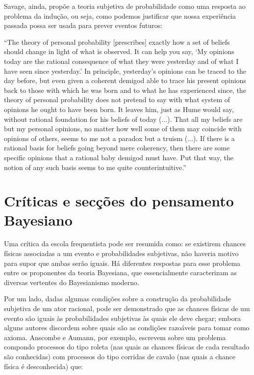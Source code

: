 Savage, ainda, propõe a teoria subjetiva de probabilidade como uma resposta ao problema da indução, ou seja,
como podemos justificar que nossa experiência passada possa ser usada para prever eventos futuros:

``The theory of personal probability [prescribes] exactly how a set of beliefs should change in light of what is observed.
It can help you say, `My opinions today are the rational consequence of what they were yesterday and of what I have seen
since yesterday.' In principle, yesterday's opinions can be traced to the day before, but even given a coherent demigod
able to trace his present opinions back to those with which he was born and to what he has experienced since, the theory
of personal probability does not pretend to say with what system of opinions he ought to have been born. It leaves him, just
as Hume would say, without rational foundation for his beliefs of today (...). That all my beliefs are but my personal
opinions, no matter how well some of them may coincide with opinions of others, seems to me not a paradox but a truism (...).
If there is a rational basis for beliefs going beyond mere coherency, then there are some specific opinions that a rational
baby demigod must have. Put that way, the notion of any such basis seems to me quite counterintuitive.'' \citep{Savage67}

\section{Críticas e secções do pensamento Bayesiano}

Uma crítica da escola frequentista pode ser resumida como: se existirem chances físicas associadas a um evento
e probabilidades subjetivas, não haveria motivo para supor que ambas serão iguais. Há diferentes respostas para esse problema 
entre os proponentes da teoria Bayesiana, que essencialmente caracterizam as diversas vertentes do Bayesianismo
moderno.

Por um lado, dadas algumas condições sobre a construção da
probabilidade subjetiva de um ator racional, pode ser demonstrado que as chances físicas de um evento são iguais 
às probabilidades subjetivas às quais ele deve chegar; embora
alguns autores discordem sobre quais são as condições razoáveis para tomar como axioma. Anscombe e Aumann, por exemplo,
escrevem sobre um problema compondo processos do tipo roleta (nas quais as chances físicas de cada resultado são conhecidas) 
com processos do tipo corridas de cavalo (nas quais a chance física é desconhecida) que:

